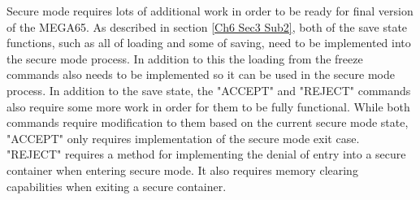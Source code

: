 Secure mode requires lots of additional work in order to be ready for final version of the MEGA65. As described in section \ref{Ch6 Sec3 Sub2}, both of the save state functions, such as all of loading and some of saving, need to be implemented into the secure mode process. In addition to this the loading from the freeze commands also needs to be implemented so it can be used in the secure mode process. In addition to the save state, the "ACCEPT" and "REJECT" commands also require some more work in order for them to be fully functional. While both commands require modification to them based on the current secure mode state, "ACCEPT" only requires implementation of the secure mode exit case. "REJECT" requires a method for implementing the denial of entry into a secure container when entering secure mode. It also requires memory clearing capabilities when exiting a secure container.

